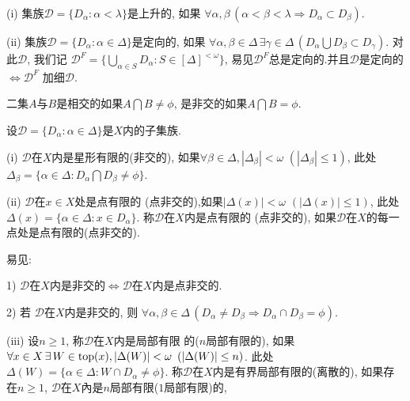 \documentclass[main.tex]{subfiles}
\begin{document}
\begin{definition}
\textnormal{(i)} 集族$\mathscr{D}=\{D_\alpha: \alpha<\lambda\}$是上升的,
如果
$\forall\alpha, \beta \,(\alpha < \beta < \lambda \Rightarrow D_\alpha \subset D_\beta )$.

\textnormal{(ii)}  集族$\mathscr{D}=\{D_\alpha: \alpha\in\Delta\}$是定向的,
如果
$\forall\alpha, \beta\in\Delta\,\exists \gamma\in \Delta\,
(D_\alpha \bigcup D_\beta \subset D_\gamma)$.
对此$\mathscr{D}$, 我们记
$\mathscr{D}^F = \{\bigcup_{\alpha\in S} D_\alpha: S\in [\Delta]^{<\omega}\}$,
易见$\mathscr{D}^F$总是定向的.并且$\mathscr{D}$是定向的
$\Leftrightarrow \mathscr{D}^F$ 加细$\mathscr{D}$.
\end{definition}
二集$A$与$B$是相交的如果$A\bigcap B\ne \phi$, 
是非交的如果$A\bigcap B=\phi$.

\begin{definition}
设$\mathscr{D}=\{D_\alpha: \alpha\in \Delta\}$是$X$内的子集族.

\textnormal{(i)} $\mathscr{D}$在$X$内是星形有限的\textnormal{(}非交的\textnormal{)}, 
如果$\forall\beta\in\Delta, |\Delta_\beta| < \omega$ $(|\Delta_\beta| \le 1)$, 此处
$\Delta_\beta = \{\alpha\in\Delta: D_\alpha\bigcap D_\beta \ne \phi\}$.
 
\textnormal{(ii)} $\mathscr{D}$在$x\in X$处是点有限的
\textnormal{(}点非交的\textnormal{)},如果$|\Delta(x)| < \omega$ $(|\Delta(x)| \le 1)$, 此处
$\Delta(x) = \{\alpha\in\Delta: x\in D_\alpha\}$.
称$\mathscr{D}$在$X$内是点有限的 
\textnormal{(}点非交的\textnormal{)}, 如果$\mathscr{D}$在$X$的每一点处是点有限的\textnormal{(}点非交的\textnormal{)}.

\textnormal{
易见:}

\textnormal{1) $\mathscr{D}$在$X$内是非交的$\Leftrightarrow$$\mathscr{D}$在$X$内是点非交的.
}

\textnormal{2) 若 $\mathscr{D}$在$X$内是非交的, 则
$\forall \alpha,\beta\in\Delta \,(D_\alpha \ne D_\beta
\Rightarrow D_\alpha\cap D_\beta = \phi).$
}

\textnormal{(iii)} 设$n\ge 1$, 称$\mathscr{D}$在$X$内是局部有限
的\textnormal{(}$n$局部有限的\textnormal{)}, 如果
$\forall x\in X\, \exists\,W\in\textnormal{top}(x), |\Delta(W)| < \omega\,\,\, (|\Delta(W)| \le n)$.
此处$\Delta(W)= \{\alpha\in \Delta: W\cap D_\alpha \ne \phi\}$.
称$\mathscr{D}$在$X$内是有界局部有限的\textnormal{(}离散的\textnormal{)},
如果存在$n\ge 1$, 
$\mathscr{D}$在$X$內是$n$局部有限\textnormal{(}$1$局部有限\textnormal{)}的,

\end{definition}
\end{document}
